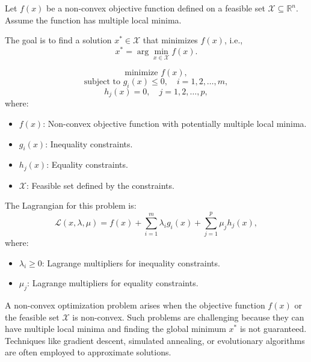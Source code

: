 Let \( f(x) \) be a non-convex objective function defined on a feasible set \( \mathcal{X} \subseteq \mathbb{R}^n \). Assume the function has multiple local minima. 

The goal is to find a solution \( x^* \in \mathcal{X} \) that minimizes \( f(x) \), i.e.,
\[
x^* = \arg \min_{x \in \mathcal{X}} f(x).
\]

\[
\text{minimize } f(x),
\]
\[
\text{subject to } g_i(x) \leq 0, \quad i = 1, 2, \ldots, m,
\]
\[
h_j(x) = 0, \quad j = 1, 2, \ldots, p,
\]
where:
\begin{itemize}
    \item \( f(x) \): Non-convex objective function with potentially multiple local minima.
    \item \( g_i(x) \): Inequality constraints.
    \item \( h_j(x) \): Equality constraints.
    \item \( \mathcal{X} \): Feasible set defined by the constraints.
\end{itemize}


The Lagrangian for this problem is:
\[
\mathcal{L}(x, \lambda, \mu) = f(x) + \sum_{i=1}^{m} \lambda_i g_i(x) + \sum_{j=1}^{p} \mu_j h_j(x),
\]
where:
\begin{itemize}
    \item \( \lambda_i \geq 0 \): Lagrange multipliers for inequality constraints.
    \item \( \mu_j \): Lagrange multipliers for equality constraints.
\end{itemize}

A non-convex optimization problem arises when the objective function \( f(x) \) or the feasible set \( \mathcal{X} \) is non-convex. Such problems are challenging because they can have multiple local minima and finding the global minimum \( x^* \) is not guaranteed. Techniques like gradient descent, simulated annealing, or evolutionary algorithms are often employed to approximate solutions.

